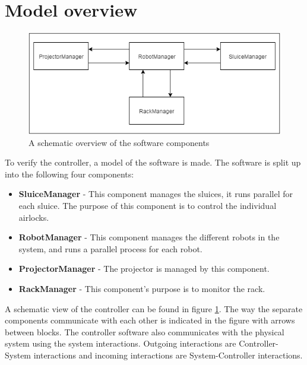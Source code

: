 \documentclass[12pt]{report}
\begin{document}
	\section{Model overview}
	\begin{figure}
		\centering
		\includegraphics[scale=0.7]{schematicoverview}
		\caption{A schematic overview of the software components}
		\label{fig:components}
	\end{figure}
	To verify the controller, a model of the software is made. The software is split up into the following four components:
	\begin{itemize}
	\item \textbf{SluiceManager} - This component manages the sluices, it runs parallel for each sluice. The purpose of this component is to control the individual airlocks.
	\item \textbf{RobotManager} - This component manages the different robots in the system, and runs a parallel process for each robot.
	\item \textbf{ProjectorManager} - The projector is managed by this component.
	\item \textbf{RackManager} - This component's purpose is to monitor the rack.
	\end{itemize}
	
	A schematic view of the controller can be found in figure \ref{fig:components}. The way the separate components communicate with each other is indicated in the figure with arrows between blocks. The controller software also communicates with the physical system using the system interactions. Outgoing interactions are Controller-System interactions and incoming interactions are System-Controller interactions.
	
\end{document}
